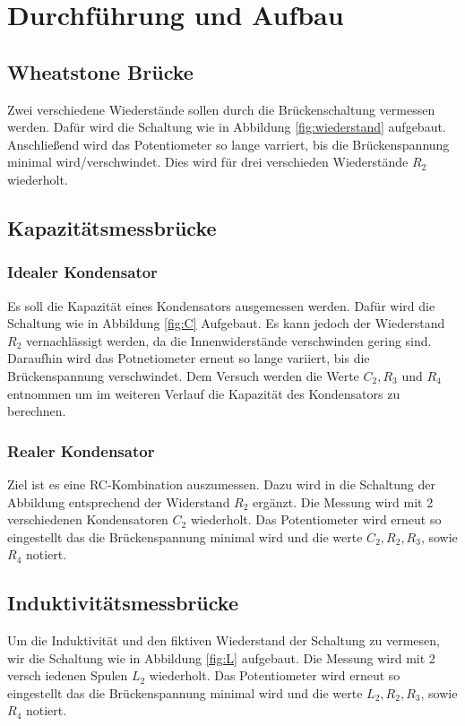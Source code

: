 \section{Durchführung und Aufbau}
\label{sec:Durchführung}

\subsection{Wheatstone Brücke}
Zwei verschiedene Wiederstände sollen durch die Brückenschaltung vermessen werden. Dafür wird die Schaltung wie in Abbildung \ref{fig:wiederstand} aufgebaut. Anschließend wird das Potentiometer so lange varriert, bis die Brückenspannung minimal wird/verschwindet. Dies wird für drei verschieden Wiederstände $R_2$ wiederholt.

\subsection{Kapazitätsmessbrücke}
\subsubsection{Idealer Kondensator}
Es soll die Kapazität eines Kondensators ausgemessen werden. Dafür wird die Schaltung wie in Abbildung \ref{fig:C} Aufgebaut. Es kann jedoch der Wiederstand $R_2$ vernachlässigt werden, da die Innenwiderstände verschwinden gering sind. Daraufhin wird das Potnetiometer erneut so lange variiert, bis die Brückenspannung verschwindet. Dem Versuch werden die Werte  $C_2, R_3$ und $R_4$ entnommen um im weiteren Verlauf die Kapazität des Kondensators zu berechnen.

\subsubsection{Realer Kondensator}
Ziel ist es eine RC-Kombination auszumessen. Dazu wird in die Schaltung der Abbildung entsprechend der Widerstand $R_2$ ergänzt. Die Messung wird mit 2 verschiedenen Kondensatoren $C_2$ wiederholt. Das Potentiometer wird erneut so eingestellt das die Brückenspannung minimal wird und die werte $C_2, R_2, R_3$, sowie  $R_4$ notiert.

\subsection{Induktivitätsmessbrücke}
Um die Induktivität und den fiktiven Wiederstand der Schaltung zu vermesen, wir die Schaltung wie in Abbildung \ref{fig:L} aufgebaut. Die Messung wird mit 2 versch
iedenen Spulen $L_2$ wiederholt. Das Potentiometer wird erneut so eingestellt das die Brückenspannung minimal wird und die werte $L_2, R_2, R_3$, sowie
  $R_4$ notiert.
  
